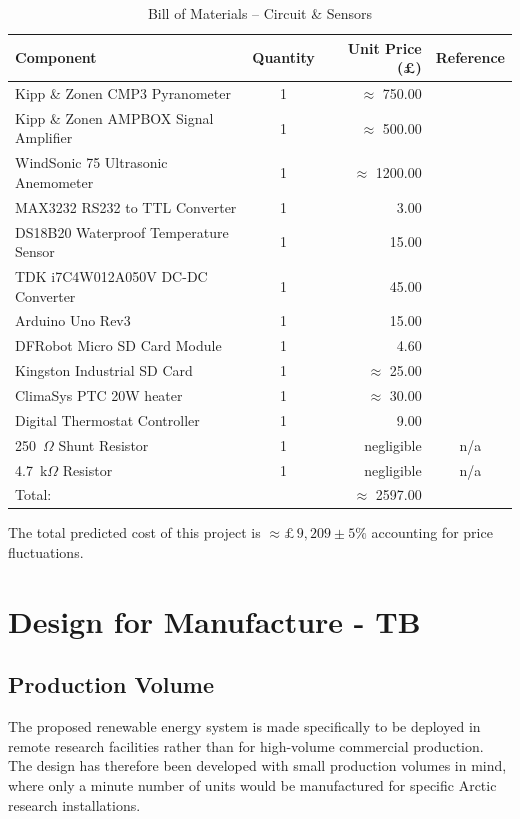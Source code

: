\documentclass[11pt,a4paper]{article}
\begin{document}
\begin{table}[H]
\centering
\caption{Bill of Materials -- Circuit \& Sensors}
\label{tab:bom_circuit}
\begin{tabular}{lcrc}
\toprule
Component & Quantity & Unit Price (£) & Reference\\
\midrule
Kipp \& Zonen CMP3 Pyranometer & 1 & $\approx$ 750.00 & \cite{pyranometer}\\
Kipp \& Zonen AMPBOX Signal Amplifier & 1 & $\approx$ 500.00 & \cite{ampbox}\\
WindSonic 75 Ultrasonic Anemometer & 1 & $\approx$ 1200.00 & \cite{windsensor}\\
MAX3232 RS232 to TTL Converter & 1 & 3.00 & \cite{rs232}\\
DS18B20 Waterproof Temperature Sensor & 1 & 15.00 & \cite{tempsensor}\\
TDK i7C4W012A050V DC-DC Converter & 1 & 45.00 & \cite{dcdc}\\
Arduino Uno Rev3 & 1 & 15.00 & \cite{arduino}\\
DFRobot Micro SD Card Module & 1 & 4.60 & \cite{sdmodule}\\
Kingston Industrial SD Card & 1 & $\approx$ 25.00 & \cite{sdcard}\\
ClimaSys PTC 20W heater & 1 & $\approx$ 30.00 & \cite{heater}\\
Digital Thermostat Controller & 1 & 9.00 & \cite{thermostat}\\
250~$\Omega$ Shunt Resistor & 1 & negligible & n/a \\
4.7~k$\Omega$ Resistor & 1 & negligible & n/a\\
\midrule
Total: &  & $\approx$ 2597.00 \\
\bottomrule
\end{tabular}
\end{table}

The total predicted cost of this project is $\approx\pounds\,9{,}209 \pm 5\%$ accounting for price fluctuations.

\section{Design for Manufacture - TB} 
\subsection{Production Volume}
The proposed renewable energy system is made specifically to be deployed in remote research facilities rather than for high-volume commercial production. The design has therefore been developed with small production volumes in mind, where only a minute number of units would be manufactured for specific Arctic research installations.
\end{document}
